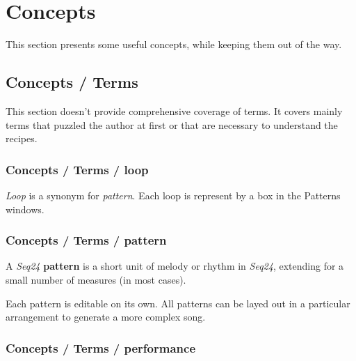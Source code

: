 %
%
%

\section{Concepts}
\label{sec:concepts}

   This section presents some useful concepts, while keeping them out of the
   way.

\subsection{Concepts / Terms}
\label{subsec:concepts_terms}

   This section doesn't provide comprehensive coverage of terms.  It
   covers mainly terms that puzzled the author at first or that are
   necessary to understand the recipes.

\subsubsection{Concepts / Terms / loop}
\label{subsubsec:concepts_terms_loop}

   \textsl{Loop}
   is a synonym for \textsl{pattern}.
   Each loop is represent by a box in the Patterns windows.

\subsubsection{Concepts / Terms / pattern}
\label{subsubsec:concepts_terms_pattern}

   A \textsl{Seq24} \textbf{pattern}
   is a short unit of melody or rhythm in \textsl{Seq24},
   extending for a small number of measures (in most cases).

   Each pattern is editable on its own.  All patterns can be layed out in
   a particular arrangement to generate a more complex song.

\subsubsection{Concepts / Terms / performance}
\label{subsubsec:concepts_terms_performance}

